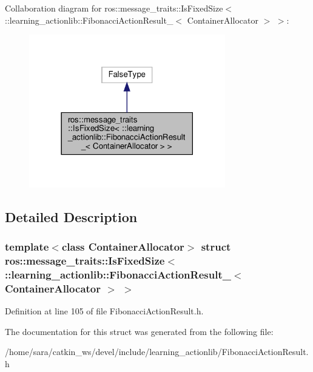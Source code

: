 Collaboration diagram for ros\+:\+:message\+\_\+traits\+:\+:Is\+Fixed\+Size$<$ \+:\+:learning\+\_\+actionlib\+:\+:Fibonacci\+Action\+Result\+\_\+$<$ Container\+Allocator $>$ $>$\+:
\nopagebreak
\begin{figure}[H]
\begin{center}
\leavevmode
\includegraphics[width=242pt]{structros_1_1message__traits_1_1IsFixedSize_3_01_1_1learning__actionlib_1_1FibonacciActionResult0a07840d60fda9d76a3d7c3623a23486}
\end{center}
\end{figure}


\subsection{Detailed Description}
\subsubsection*{template$<$class Container\+Allocator$>$\newline
struct ros\+::message\+\_\+traits\+::\+Is\+Fixed\+Size$<$ \+::learning\+\_\+actionlib\+::\+Fibonacci\+Action\+Result\+\_\+$<$ Container\+Allocator $>$ $>$}



Definition at line 105 of file Fibonacci\+Action\+Result.\+h.



The documentation for this struct was generated from the following file\+:\begin{DoxyCompactItemize}
\item 
/home/sara/catkin\+\_\+ws/devel/include/learning\+\_\+actionlib/Fibonacci\+Action\+Result.\+h\end{DoxyCompactItemize}
